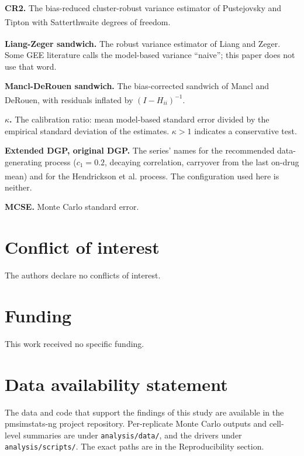 \documentclass[
  11pt,
]{article}
\begin{document}
\textbf{CR2.} The bias-reduced cluster-robust variance estimator of
Pustejovsky and Tipton\textsuperscript{} with Satterthwaite degrees of freedom.

\textbf{Liang-Zeger sandwich.} The robust variance estimator of
Liang and Zeger\textsuperscript{}. Some GEE literature calls the model-based variance
``naive''; this paper does not use that word.

\textbf{Mancl-DeRouen sandwich.} The bias-corrected sandwich of
Mancl and DeRouen\textsuperscript{}, with residuals inflated by \((I -
H_{ii})^{-1}\).

\textbf{\(\kappa\).} The calibration ratio: mean model-based standard error
divided by the empirical standard deviation of the estimates.
\(\kappa > 1\) indicates a conservative test.

\textbf{Extended DGP, original DGP.} The series' names for the
recommended data-generating process (\(c_1 = 0.2\), decaying
correlation, carryover from the last on-drug mean) and for the
Hendrickson et al.\textsuperscript{} process. The configuration used here is neither.

\textbf{MCSE.} Monte Carlo standard error.

\section{Conflict of interest}\label{conflict-of-interest}

The authors declare no conflicts of interest.

\section{Funding}\label{funding}

This work received no specific funding.

\section{Data availability statement}\label{data-availability-statement}

The data and code that support the findings of this study are
available in the pmsimstats-ng project repository. Per-replicate
Monte Carlo outputs and cell-level summaries are under
\texttt{analysis/data/}, and the drivers under \texttt{analysis/scripts/}. The
exact paths are in the Reproducibility section.
\end{document}
